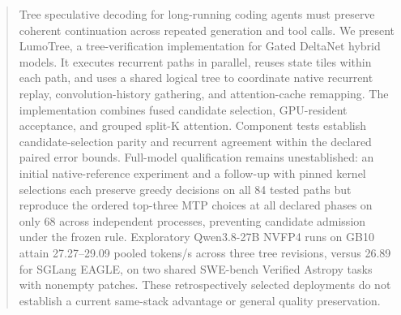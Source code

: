 \begin{abstract}
Tree speculative decoding for long-running coding agents must preserve coherent continuation across repeated generation and tool calls. We present LumoTree, a tree-verification implementation for Gated DeltaNet hybrid models. It executes recurrent paths in parallel, reuses state tiles within each path, and uses a shared logical tree to coordinate native recurrent replay, convolution-history gathering, and attention-cache remapping. The implementation combines fused candidate selection, GPU-resident acceptance, and grouped split-K attention. Component tests establish candidate-selection parity and recurrent agreement within the declared paired error bounds. Full-model qualification remains unestablished: an initial native-reference experiment and a follow-up with pinned kernel selections each preserve greedy decisions on all 84 tested paths but reproduce the ordered top-three MTP choices at all declared phases on only 68 across independent processes, preventing candidate admission under the frozen rule. Exploratory Qwen3.8-27B NVFP4 runs on GB10 attain 27.27--29.09 pooled tokens/s across three tree revisions, versus 26.89 for SGLang EAGLE, on two shared SWE-bench Verified Astropy tasks with nonempty patches. These retrospectively selected deployments do not establish a current same-stack advantage or general quality preservation.
\end{abstract}
